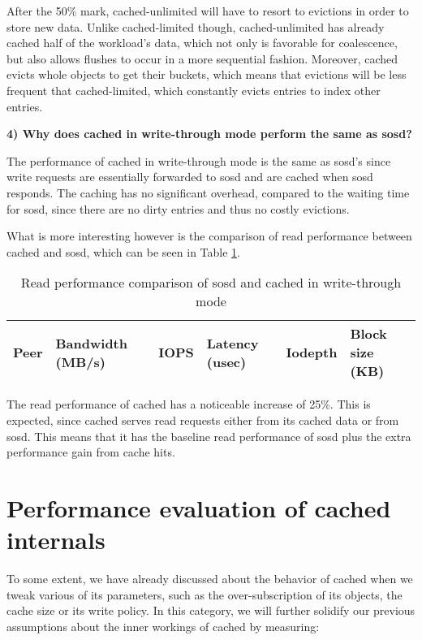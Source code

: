 After the 50\% mark, cached-unlimited will have to resort to evictions in order 
to store new data. Unlike cached-limited though, cached-unlimited has already 
cached half of the workload's data, which not only is favorable for 
coalescence, but also allows flushes to occur in a more sequential fashion.  
Moreover, cached evicts whole objects to get their buckets, which means that 
evictions will be less frequent that cached-limited, which constantly evicts 
entries to index other entries.

\textbf{4) Why does cached in write-through mode perform the same as sosd?}

The performance of cached in write-through mode is the same as sosd's since 
write requests are essentially forwarded to sosd and are cached when sosd 
responds. The caching has no significant overhead, compared to the waiting time 
for sosd, since there are no dirty entries and thus no costly evictions.

What is more interesting however is the comparison of read performance between 
cached and sosd, which can be seen in Table \ref{tab:writethrough}.

\begin{table}[H]
	\centering
	\begin{tabular}{ | l | l | l | l | l | l |}
		\hline
		Peer& Bandwidth (MB/s) & IOPS	& Latency (usec) & Iodepth & Block size 
		(KB) \\
		\hline \hline
		
		
	\end{tabular}
	\caption{Read performance comparison of sosd and cached in 
		write-through mode}
	\label{tab:writethrough}
\end{table}

The read performance of cached has a noticeable increase of 25\%. This is 
expected, since cached serves read requests either from its cached data or from 
sosd. This means that it has the baseline read performance of sosd plus the 
extra performance gain from cache hits.

\section{Performance evaluation of cached internals}\label{sec:internals-plot}

To some extent, we have already discussed about the behavior of cached when we 
tweak various of its parameters, such as the over-subscription of its objects, 
the cache size or its write policy. In this category, we will further solidify 
our previous assumptions about the inner workings of cached by measuring:

